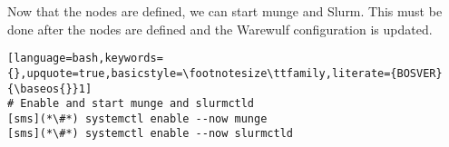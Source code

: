 Now that the nodes are defined, we can start munge and Slurm.  This must be done
after the nodes are defined and the Warewulf configuration is updated.

\begin{lstlisting}[language=bash,keywords={},upquote=true,basicstyle=\footnotesize\ttfamily,literate={BOSVER}{\baseos{}}1]
# Enable and start munge and slurmctld
[sms](*\#*) systemctl enable --now munge
[sms](*\#*) systemctl enable --now slurmctld
\end{lstlisting}

